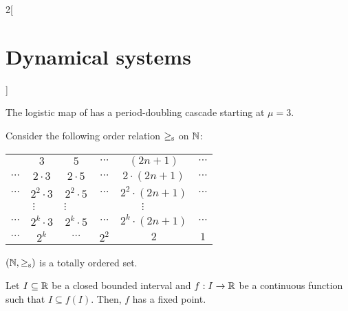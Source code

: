 \documentclass[../../../main_math.tex]{subfiles}
\begin{document}
\begin{multicols}{2}[\section{Dynamical systems}]
\begin{definition}
  \end{definition}
  \begin{theorem}
    The logistic map of  has a period-doubling cascade starting at $\mu = 3$.
  \end{theorem}
  \begin{definition}
    Consider the following order relation $\sharkgeq$ on $\mathbb{N}$:
    \begin{center}
      \def\arraystretch{1}
      \begin{tabular}{c@{ $\sharkgeq$ }c@{ $\sharkgeq$ }c@{ $\sharkgeq$ }c@{ $\sharkgeq$ }c@{ $\sharkgeq$ }c}
        \multicolumn{1}{c}{} & $3$                                   & $5$                                  & $\cdots$             & $(2n+1)$                             & $\cdots$             \\
        $\cdots$             & $2\cdot 3$                            & $2\cdot5$                            & $\cdots$             & $2\cdot(2n+1)$                       & $\cdots$             \\
        $\cdots$             & $2^2\cdot 3$                          & $2^2\cdot5$                          & $\cdots$             & $2^2\cdot(2n+1)$                     & $\cdots$             \\
        \multicolumn{1}{c}{} & \multicolumn{1}{c}{$\vdots\quad\ \ $} & \multicolumn{1}{c}{$\vdots\qquad\!$} & \multicolumn{1}{c}{} & \multicolumn{1}{c}{$\vdots\qquad\!$} & \multicolumn{1}{c}{} \\
        $\cdots$             & $2^k\cdot 3$                          & $2^k\cdot5$                          & $\cdots$             & $2^k\cdot(2n+1)$                     & $\cdots$             \\
        $\cdots$             & $2^k$                                 & $\cdots$                             & $2^2$                & $2$                                  & $1$                  \\
      \end{tabular}
    \end{center}
  \end{definition}
  \begin{lemma}
    $(\mathbb{N},\mathbin{\geq_{\mathrm{s}}})$ is a totally ordered set.
  \end{lemma}
  \begin{proposition}
    Let $I\subseteq\mathbb{R}$ be a closed bounded interval and $f:I\rightarrow \mathbb{R}$ be a continuous function such that $I\subseteq f(I)$. Then, $f$ has a fixed point.

\end{proposition}
\end{multicols}
\end{document}
